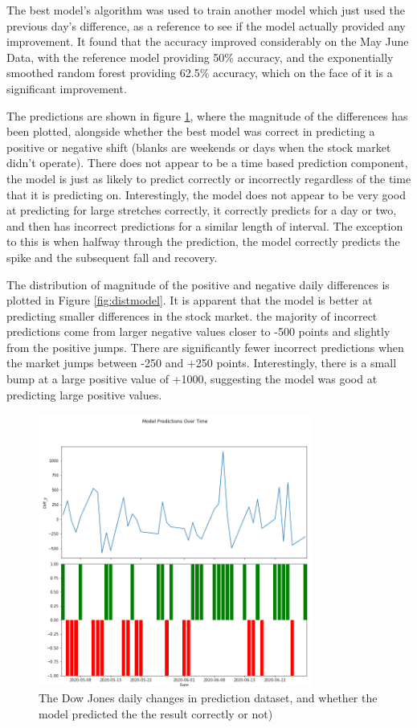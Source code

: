 The best model's algorithm was used to train another model which just used the previous day's difference, as a reference to see if the model actually provided any improvement. It found that the accuracy improved considerably on the May June Data, with the reference model providing 50\% accuracy, and the exponentially smoothed random forest providing 62.5\% accuracy, which on the face of it is a significant improvement. 

The predictions are shown in figure \ref{fig:modelpred}, where the magnitude of the differences has been plotted, alongside whether the best model was correct in predicting a positive or negative shift (blanks are weekends or days when the stock market didn't operate). There does not appear to be a time based prediction component, the model is just as likely to predict correctly or incorrectly regardless of the time that it is predicting on. Interestingly, the model does not appear to be very good at predicting for large stretches correctly, it correctly predicts for a day or two, and then has incorrect predictions for a similar length of interval. The exception to this is when halfway through the prediction, the model correctly predicts the spike and the subsequent fall and recovery. 

The distribution of magnitude of the positive and negative daily differences is plotted in Figure \ref{fig:distmodel}.  It is apparent that the model is better at predicting smaller differences in the stock market. the majority of incorrect predictions come from larger negative values closer to -500 points and slightly from the positive jumps. There are significantly fewer incorrect predictions when the market jumps between -250 and +250 points. Interestingly, there is a small bump at a large positive value of +1000, suggesting the model was good at predicting large positive values. 

\begin{figure}[H]
	\centering
	\includegraphics[width=0.8\textwidth]{images/model_pred_time.png}
	\caption{The Dow Jones daily changes in prediction dataset, and whether the model predicted the the result correctly or not)}
	\label{fig:modelpred}
\end{figure}


